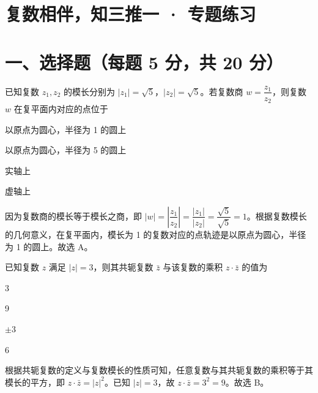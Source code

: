 \documentclass{exam-zh}
\begin{document}
\section*{复数相伴，知三推一 · 专题练习}

\section*{一、选择题（每题 5 分，共 20 分）}


\begin{question}[points=5]
  已知复数 $z_1, z_2$ 的模长分别为 $|z_1| = \sqrt{5}$，$|z_2| = \sqrt{5}$。若复数商 $w = \dfrac{z_1}{z_2}$，则复数 $w$ 在复平面内对应的点位于
  \begin{choices}
    \item 以原点为圆心，半径为 1 的圆上
    \item 以原点为圆心，半径为 5 的圆上
    \item 实轴上
    \item 虚轴上
  \end{choices}
  \paren[A]
  \begin{solutionblock}
    因为复数商的模长等于模长之商，即 $|w| = \left|\dfrac{z_1}{z_2}\right| = \dfrac{|z_1|}{|z_2|} = \dfrac{\sqrt{5}}{\sqrt{5}} = 1$。根据复数模长的几何意义，在复平面内，模长为 1 的复数对应的点轨迹是以原点为圆心，半径为 1 的圆上。故选 A。
  \end{solutionblock}
\end{question}



\begin{question}[points=5]
  已知复数 $z$ 满足 $|z| = 3$，则其共轭复数 $\bar{z}$ 与该复数的乘积 $z \cdot \bar{z}$ 的值为
  \begin{choices}
    \item 3
    \item 9
    \item $\pm 3$
    \item 6
  \end{choices}
  \paren[B]
  \begin{solutionblock}
    根据共轭复数的定义与复数模长的性质可知，任意复数与其共轭复数的乘积等于其模长的平方，即 $z \cdot \bar{z} = |z|^2$。已知 $|z| = 3$，故 $z \cdot \bar{z} = 3^2 = 9$。故选 B。
  \end{solutionblock}
\end{question}
\end{document}

